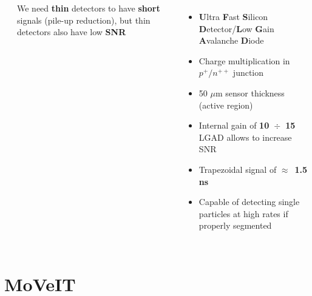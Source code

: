 \documentclass[aspectratio=169]{beamer}
\begin{document}
\begin{frame}
\begin{columns}
\begin{columns}
\begin{center}
			\end{center}
		\begin{center}
			We need \textbf{thin} detectors to have \textbf{short} signals (pile-up reduction), but thin detectors also have low \textbf{SNR}
		\end{center}
	\end{columns}
		\begin{itemize}
			\item \textbf{U}ltra \textbf{F}ast \textbf{S}ilicon \textbf{D}etector/\textbf{L}ow \textbf{G}ain \textbf{A}valanche \textbf{D}iode
			\item Charge multiplication in $p^+ / n^{++}$ junction 
			\item 50 $\mu$m sensor thickness (active region)
			\item Internal gain of \textbf{10~$\div$~15}\\
			 	LGAD allows to increase SNR 
			\item Trapezoidal signal of $\approx$~\textbf{1.5 ns}
			\item Capable of detecting single particles at high rates if properly segmented
		\end{itemize}
	\end{columns}
	\end{frame}

	\section{MoVeIT}
	
\end{document}
